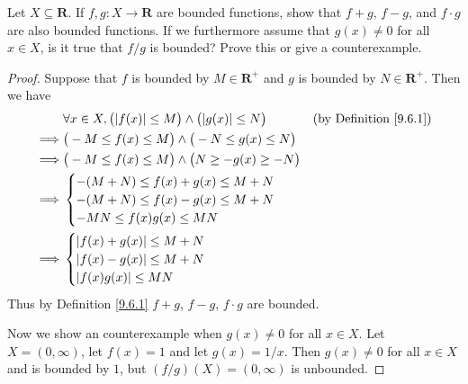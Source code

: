 \begin{exercise}\label{ex 9.6.2}
    Let \(X \subseteq \mathbf{R}\).
    If \(f, g: X \to \mathbf{R}\) are bounded functions, show that \(f + g\), \(f - g\), and \(f \cdot g\) are also bounded functions.
    If we furthermore assume that \(g(x) \neq 0\) for all \(x \in X\), is it true that \(f / g\) is bounded?
    Prove this or give a counterexample.
\end{exercise}

\begin{proof}
    Suppose that \(f\) is bounded by \(M \in \mathbf{R}^+\) and \(g\) is bounded by \(N \in \mathbf{R}^+\).
    Then we have
    \begin{align*}
                 & \forall x \in X, \big(\abs*{f(x)} \leq M\big) \land \big(\abs*{g(x)} \leq N\big) & \text{(by Definition \ref{9.6.1})} \\
        \implies & \big(-M \leq f(x) \leq M\big) \land \big(-N \leq g(x) \leq N\big)                                                     \\
        \implies & \big(-M \leq f(x) \leq M\big) \land \big(N \geq -g(x) \geq -N\big)                                                    \\
        \implies & \begin{cases}
                       -(M + N) \leq f(x) + g(x) \leq M + N \\
                       -(M + N) \leq f(x) - g(x) \leq M + N \\
                       -MN \leq f(x) g(x) \leq MN
                   \end{cases}                                                                                  \\
        \implies & \begin{cases}
                       \abs*{f(x) + g(x)} \leq M + N \\
                       \abs*{f(x) - g(x)} \leq M + N \\
                       \abs*{f(x) g(x)} \leq MN
                   \end{cases}
    \end{align*}
    Thus by Definition \ref{9.6.1} \(f + g\), \(f - g\), \(f \cdot g\) are bounded.

    Now we show an counterexample when \(g(x) \neq 0\) for all \(x \in X\).
    Let \(X = (0, \infty)\), let \(f(x) = 1\) and let \(g(x) = 1 / x\).
    Then \(g(x) \neq 0\) for all \(x \in X\) and is bounded by \(1\), but \((f / g)(X) = (0, \infty)\) is unbounded.
\end{proof}